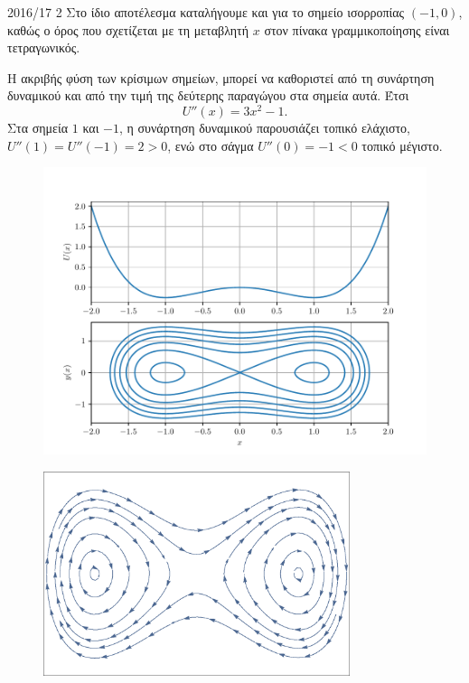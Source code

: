 \begin{solution}{2016/17 2}
    Στο ίδιο αποτέλεσμα καταλήγουμε και για το σημείο ισορροπίας \( (-1,
    0) \), καθώς ο όρος που σχετίζεται με τη μεταβλητή \(x\) στον πίνακα
    γραμμικοποίησης είναι τετραγωνικός.

    Η ακριβής φύση των κρίσιμων σημείων, μπορεί να καθοριστεί από τη συνάρτηση δυναμικού
    και από την τιμή της δεύτερης παραγώγου στα σημεία αυτά. Έτσι
    \begin{equation*}
        U''(x) = 3x^2 - 1.
    \end{equation*}
    Στα σημεία \( 1 \) και \( -1 \), η συνάρτηση δυναμικού παρουσιάζει τοπικό
    ελάχιστο, \( U''(1) = U''(-1) = 2 > 0 \), ενώ στο σάγμα \( U''(0) = -1 < 0
    \) τοπικό μέγιστο.

    \begin{figure}[h]
        \centering
        \includegraphics[width=1\textwidth]{figures/ex2_undampedDuffing.pdf}
        \caption{}
        \label{fig:ex2_undampedDuffing}
    \end{figure}
    \begin{figure}[h]
        \centering
        \includegraphics[width=0.8\textwidth]{figures/ex2_undampedDuffingVectorField.eps}

\end{figure}
\end{solution}
